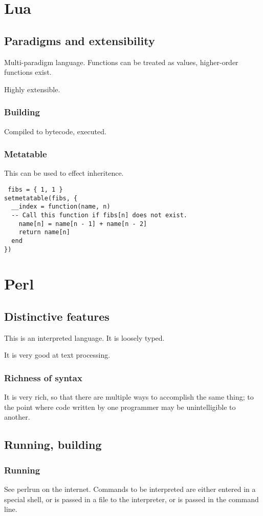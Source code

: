 \documentclass[oneside, article]{memoir}
\begin{document}
\chapter{Lua}
\section{Paradigms and extensibility}
Multi-paradigm language. Functions can be treated as values, higher-order functions exist.

Highly extensible.

\subsection{Building}
Compiled to bytecode, executed.

\subsection{Metatable}
This can be used to effect inheritence.
\begin{verbatim}
 fibs = { 1, 1 }
setmetatable(fibs, {
  __index = function(name, n)
  -- Call this function if fibs[n] does not exist.
    name[n] = name[n - 1] + name[n - 2]
    return name[n]
  end
})
\end{verbatim}


\chapter{Perl}
\section{Distinctive features}
This is an interpreted language. It is loosely typed.

It is very good at text processing.

\subsection{Richness of syntax}
It is very rich, so that there are multiple ways to accomplish the same thing; to the point where code written by one programmer may be unintelligible to another.

\section{Running, building}
\subsection{Running}
See perlrun on the internet. Commands to be interpreted are either entered in a special shell, or is passed in a file to the interpreter, or is passed in the command line.
\end{document}
